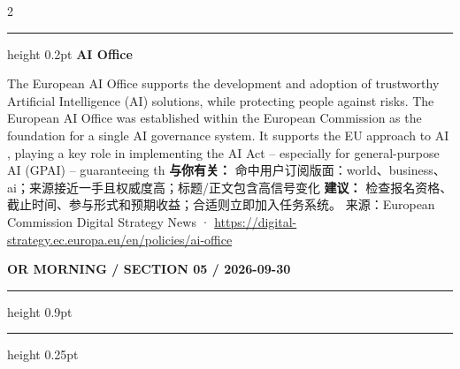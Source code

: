\documentclass[10.5pt]{ctexart}
\begin{document}
\begin{multicols}{2}
\vspace{2mm}
\hrule height 0.2pt
\vspace{2mm}
{\large\bfseries AI Office}\par
The European AI Office supports the development and adoption of trustworthy Artificial Intelligence (AI) solutions, while protecting people against risks. The European AI Office was established within the European Commission as the foundation for a single AI governance system. It supports the EU approach to AI , playing a key role in implementing the AI Act – especially for general-purpose AI (GPAI) – guaranteeing th
\textbf{与你有关：} 命中用户订阅版面：world、business、ai；来源接近一手且权威度高；标题/正文包含高信号变化
\textbf{建议：} 检查报名资格、截止时间、参与形式和预期收益；合适则立即加入任务系统。
{\footnotesize\color{ormuted} 来源：European Commission Digital Strategy News · \url{https://digital-strategy.ec.europa.eu/en/policies/ai-office}}
\end{multicols}
\newpage
{\small\bfseries OR MORNING / SECTION 05 / 2026-09-30}
\vspace{2mm}
\hrule height 0.9pt
\vspace{1.5mm}
\hrule height 0.25pt
\vspace{4mm}
\end{document}
